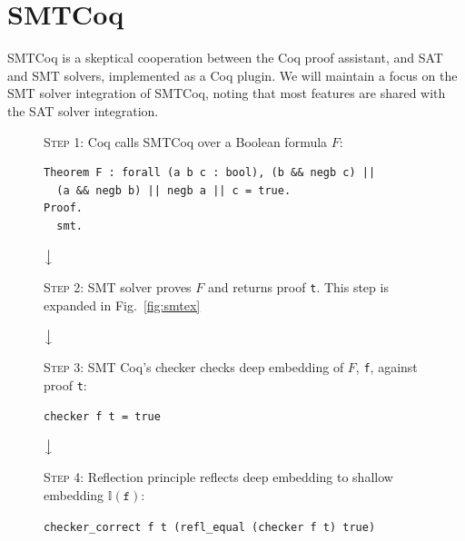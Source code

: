 \documentclass{article}
\begin{document}
	
	\section{SMTCoq}
	\label{sec:smtcoq}
	SMTCoq is a skeptical cooperation 
	between the Coq proof assistant, and 
	SAT and SMT solvers, implemented as a 
	Coq plugin. We will maintain a focus 
	on the SMT solver integration of 
	SMTCoq, noting that most features are 
	shared with the SAT	solver integration.
	
	\begin{figure}
		\begin{framed}
			\textsc{Step 1}: Coq calls SMTCoq over 
			a Boolean formula $F$:
			\begin{verbatim}
Theorem F : forall (a b c : bool), (b && negb c) || 
  (a && negb b) || negb a || c = true.
Proof.
  smt.
			\end{verbatim}
		\end{framed}
		
		\begin{center}
			$\big\downarrow$
		\end{center}
		
		\begin{framed}
			\begin{center}
				\textsc{Step 2}: SMT solver 
				proves $F$ and returns proof 
				\texttt{t}. This step is 
				expanded in Fig.~\ref{fig:smtex}
			\end{center}
		\end{framed}
		
		\begin{center}
			$\big\downarrow$
		\end{center}
		
		\begin{framed}
			\textsc{Step 3}: SMT Coq's checker 
			checks deep embedding of $F$, 
			\texttt{f}, against proof 
			\texttt{t}:
			\begin{center}
				\texttt{checker f t = true}
			\end{center}
		\end{framed}
		
		\begin{center}
			$\big\downarrow$
		\end{center}
		
		\begin{framed}
			\textsc{Step 4}: Reflection principle 
			reflects deep embedding to shallow 
			embedding $\mathbb{I}(\texttt{f})$:
			\begin{center}
				\texttt{checker\_correct f t 
					(refl\_equal (checker 
					f t) true)}
			\end{center}
		\end{framed}
		

\end{figure}
\end{document}
